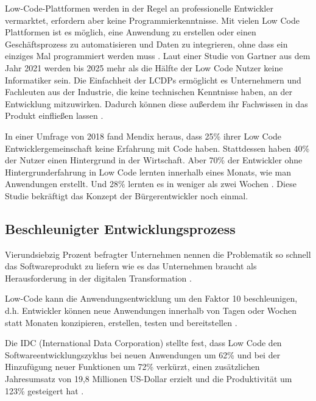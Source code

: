 \documentclass[12pt]{article} %
\begin{document}
	Low-Code-Plattformen werden in der Regel an professionelle Entwickler vermarktet, erfordern aber keine Programmierkenntnisse. Mit vielen Low Code Plattformen ist es möglich, eine Anwendung zu erstellen oder einen Geschäftsprozess zu automatisieren und Daten zu integrieren, ohne dass ein einziges Mal programmiert werden muss \autocite{MichelleGardner.2022}. Laut einer Studie von Gartner aus dem Jahr 2021 werden bis 2025 mehr als die Hälfte der Low Code Nutzer keine Informatiker sein. Die Einfachheit der LCDPs ermöglicht es Unternehmern und Fachleuten aus der Industrie, die keine technischen Kenntnisse haben, an der Entwicklung mitzuwirken. Dadurch können diese außerdem ihr Fachwissen in das Produkt einfließen lassen \autocite{OleksiiGlib.2022}. \newline
	
	In einer Umfrage von 2018 fand Mendix heraus, dass 25\% ihrer Low Code Entwicklergemeinschaft keine Erfahrung mit Code haben. Stattdessen haben 40\% der Nutzer einen Hintergrund in der Wirtschaft. Aber 70\% der Entwickler ohne Hintergrunderfahrung in Low Code lernten innerhalb eines Monats, wie man Anwendungen erstellt. Und 28\% lernten es in weniger als zwei Wochen \autocite{KevinShuler.2023}. Diese Studie bekräftigt das Konzept der Bürgerentwickler noch einmal.
	
	\subsection{Beschleunigter Entwicklungsprozess}	\label{faster}
	Vierundsiebzig Prozent befragter Unternehmen nennen die Problematik so schnell das Softwareprodukt zu liefern wie es das Unternehmen braucht als Herausforderung in der digitalen Transformation \autocite{EmmaVanPelt.2019}. \newline %
	
	Low-Code kann die Anwendungsentwicklung um den Faktor 10 beschleunigen, d.h. Entwickler können neue Anwendungen innerhalb von Tagen oder Wochen statt Monaten konzipieren, erstellen, testen und bereitstellen \autocite{KevinShuler.2023}. \newline
	
	Die IDC (International Data Corporation) stellte fest, dass Low Code den Softwareentwicklungszyklus bei neuen Anwendungen um 62\% und bei der Hinzufügung neuer Funktionen um 72\% verkürzt, einen zusätzlichen Jahresumsatz von 19,8 Millionen US-Dollar erzielt und die Produktivität um 123\% gesteigert hat \autocite{KevinShuler.2023}.
	
\end{document}
